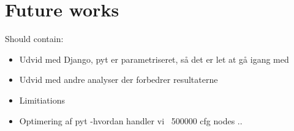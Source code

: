 \section{Future works}

Should contain:
\begin{itemize}
\item Udvid med Django, pyt er parametriseret, så det er let at gå igang med
\item Udvid med andre analyser der forbedrer resultaterne
\item Limitiations
\item Optimering af pyt -hvordan handler vi ~500000 cfg nodes ..
\end{itemize}
